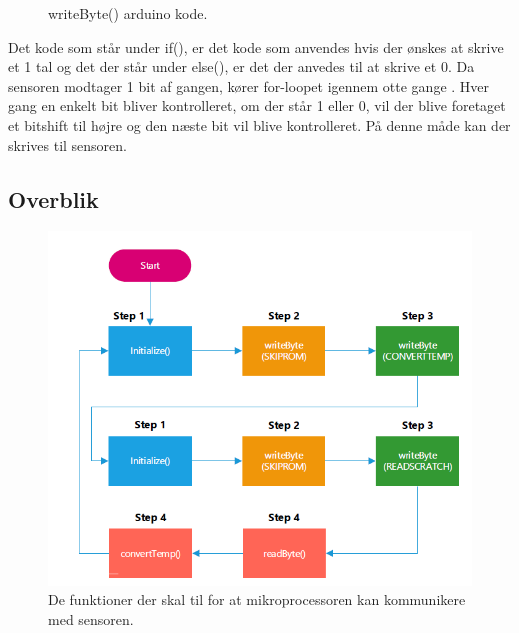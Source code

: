 \begin{figure}[h!]
  \centering
  \caption{writeByte() arduino kode.}
  \label{write_byte}
\end{figure}
Det kode som står under if(), er det kode som anvendes hvis der ønskes at skrive et 1 tal og det der står under else(), er det der anvedes til at skrive et 0. Da sensoren modtager 1 bit af gangen, kører for-loopet igennem otte gange . Hver gang en enkelt bit bliver kontrolleret, om der står 1 eller 0, vil der blive foretaget et bitshift til højre og den næste bit vil blive kontrolleret. På denne måde kan der skrives til sensoren.


\subsection{Overblik}

\begin{figure}[h!]
  \centering
  \includegraphics[width=1\textwidth]{figures/sensor_communication.png}
  \caption{De funktioner der skal til for at mikroprocessoren kan kommunikere med sensoren.}
  \label{sensor_total}
\end{figure}